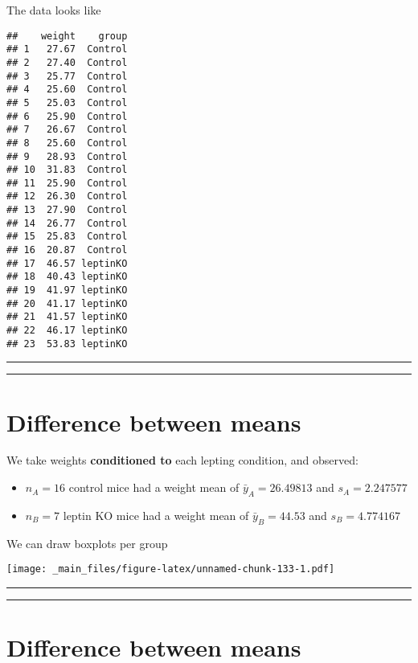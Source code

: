 \documentclass[
]{book}
\begin{document}
The data looks like

\begin{verbatim}
##    weight    group
## 1   27.67  Control
## 2   27.40  Control
## 3   25.77  Control
## 4   25.60  Control
## 5   25.03  Control
## 6   25.90  Control
## 7   26.67  Control
## 8   25.60  Control
## 9   28.93  Control
## 10  31.83  Control
## 11  25.90  Control
## 12  26.30  Control
## 13  27.90  Control
## 14  26.77  Control
## 15  25.83  Control
## 16  20.87  Control
## 17  46.57 leptinKO
## 18  40.43 leptinKO
## 19  41.97 leptinKO
## 20  41.17 leptinKO
## 21  41.57 leptinKO
## 22  46.17 leptinKO
## 23  53.83 leptinKO
\end{verbatim}

\begin{center}\rule{0.5\linewidth}{0.5pt}\end{center}

\begin{center}\rule{0.5\linewidth}{0.5pt}\end{center}

\hypertarget{difference-between-means-6}{%
\section{Difference between means}\label{difference-between-means-6}}

We take weights \textbf{conditioned to} each lepting condition, and observed:

\begin{itemize}
\item
  \(n_A=16\) control mice had a weight mean of \(\bar{y}_A=26.49813\) and \(s_A=2.247577\)
\item
  \(n_B=7\) leptin KO mice had a weight mean of \(\bar{y}_B=44.53\) and \(s_B=4.774167\)
\end{itemize}

We can draw boxplots per group

\texttt{[image: \_main\_files/figure-latex/unnamed-chunk-133-1.pdf]}

\begin{center}\rule{0.5\linewidth}{0.5pt}\end{center}

\begin{center}\rule{0.5\linewidth}{0.5pt}\end{center}

\hypertarget{difference-between-means-7}{%
\section{Difference between means}\label{difference-between-means-7}}
\end{document}
